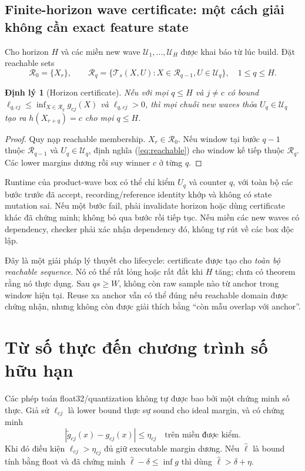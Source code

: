\documentclass[11pt,a4paper]{article}
\newcommand{\Uset}{\mathcal U}
\newtheorem{theorem}[definition]{Định lý}
\theoremstyle{remark}
\begin{document}
\subsection{Finite-horizon wave certificate: một cách giải không cần exact feature state}
Cho horizon $H$ và các miền new wave $\Uset_1,\ldots,\Uset_H$ được khai
báo từ lúc build. Đặt reachable sets
\begin{equation}
 \mathcal R_0=\{X_r\},\qquad
 \mathcal R_q=\{\mathcal T_s(X,U):X\in\mathcal R_{q-1},
 U\in\Uset_q\},\quad1\le q\le H.
 \label{eq:reachable}
\end{equation}
\begin{theorem}[Horizon certificate]\label{th:horizon}
Nếu với mọi $q\le H$ và $j\ne c$ có bound
$\ell_{q,cj}\le\inf_{X\in\mathcal R_q}g_{cj}(X)$ và
$\ell_{q,cj}>0$, thì mọi chuỗi new waves thỏa
$U_q\in\Uset_q$ tạo ra $h(X_{r+q})=c$ cho mọi $q\le H$.
\end{theorem}
\begin{proof}
Quy nạp reachable membership. $X_r\in\mathcal R_0$. Nếu window tại bước
$q-1$ thuộc $\mathcal R_{q-1}$ và $U_q\in\Uset_q$, định nghĩa
(\ref{eq:reachable}) cho window kế tiếp thuộc $\mathcal R_q$. Các lower
margins dương rồi suy winner $c$ ở từng $q$.
\end{proof}
Runtime của product-wave box có thể chỉ kiểm $U_q$ và counter $q$, với
toàn bộ các bước trước đã accept, recording/reference identity khớp và
không có state mutation sai. Nếu một bước fail, phải invalidate horizon
hoặc dùng certificate khác đã chứng minh; không bỏ qua bước rồi tiếp tục.
Nếu miền các new waves có dependency, checker phải xác nhận dependency đó,
không tự rút về các box độc lập.

Đây là một giải pháp lý thuyết cho lifecycle: certificate được tạo cho
\emph{toàn bộ reachable sequence}. Nó có thể rất lỏng hoặc rất đắt khi
$H$ tăng; chưa có theorem rằng nó thực dụng. Sau $qs\ge W$, không còn raw
sample nào từ anchor trong window hiện tại. Reuse xa anchor vẫn có thể
đúng nếu reachable domain được chứng nhận, nhưng không còn được giải thích
bằng ``còn mẫu overlap với anchor''.

\section{Từ số thực đến chương trình số hữu hạn}
Các phép toán float32/quantization không tự được bao bởi một chứng minh
số thực. Giả sử $\ell_{cj}$ là lower bound thực sự sound cho ideal margin,
và có chứng minh
\begin{equation}
 |\widetilde g_{cj}(x)-g_{cj}(x)|\le\eta_{cj}
 \quad\text{trên miền được kiểm}.
\end{equation}
Khi đó điều kiện $\ell_{cj}>\eta_{cj}$ đủ giữ executable margin dương.
Nếu $\widehat\ell$ là bound tính bằng float và đã chứng minh
$\widehat\ell-\delta\le\inf g$ thì dùng
$\widehat\ell>\delta+\eta$.
\end{document}
